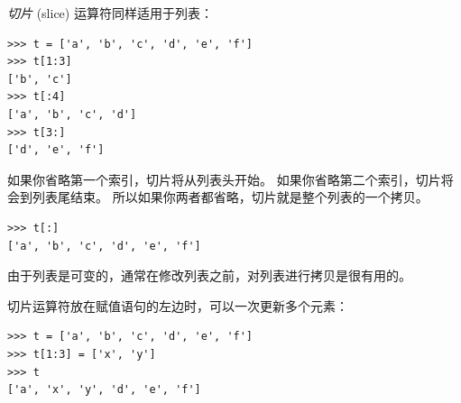 {\em 切片} (slice) 运算符同样适用于列表：


\begin{lstlisting}
>>> t = ['a', 'b', 'c', 'd', 'e', 'f']
>>> t[1:3]
['b', 'c']
>>> t[:4]
['a', 'b', 'c', 'd']
>>> t[3:]
['d', 'e', 'f']
\end{lstlisting}
%

如果你省略第一个索引，切片将从列表头开始。 如果你省略第二个索引，切片将会到列表尾结束。
所以如果你两者都省略，切片就是整个列表的一个拷贝。
  

\begin{lstlisting}
>>> t[:]
['a', 'b', 'c', 'd', 'e', 'f']
\end{lstlisting}

%

由于列表是可变的，通常在修改列表之前，对列表进行拷贝是很有用的。


切片运算符放在赋值语句的左边时，可以一次更新多个元素：
  

\begin{lstlisting}
>>> t = ['a', 'b', 'c', 'd', 'e', 'f']
>>> t[1:3] = ['x', 'y']
>>> t
['a', 'x', 'y', 'd', 'e', 'f']
\end{lstlisting}

%


%

%


